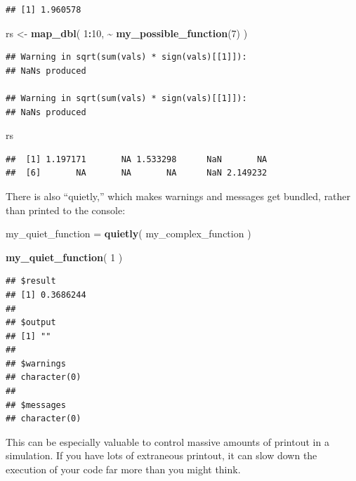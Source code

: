 \documentclass[
]{book}
\newenvironment{Shaded}{\begin{snugshade}}{\end{snugshade}}
\newcommand{\DecValTok}[1]{\textcolor[rgb]{0.00,0.00,0.81}{#1}}
\newcommand{\FunctionTok}[1]{\textcolor[rgb]{0.13,0.29,0.53}{\textbf{#1}}}
\newcommand{\NormalTok}[1]{#1}
\newcommand{\OtherTok}[1]{\textcolor[rgb]{0.56,0.35,0.01}{#1}}
\newcommand{\SpecialCharTok}[1]{\textcolor[rgb]{0.81,0.36,0.00}{\textbf{#1}}}
\begin{document}
\begin{verbatim}
## [1] 1.960578
\end{verbatim}

\begin{Shaded}
\begin{Highlighting}[]
\NormalTok{rs }\OtherTok{\textless{}{-}} \FunctionTok{map\_dbl}\NormalTok{( }\DecValTok{1}\SpecialCharTok{:}\DecValTok{10}\NormalTok{, }\SpecialCharTok{\textasciitilde{}} \FunctionTok{my\_possible\_function}\NormalTok{(}\DecValTok{7}\NormalTok{) )}
\end{Highlighting}
\end{Shaded}

\begin{verbatim}
## Warning in sqrt(sum(vals) * sign(vals)[[1]]):
## NaNs produced

## Warning in sqrt(sum(vals) * sign(vals)[[1]]):
## NaNs produced
\end{verbatim}

\begin{Shaded}
\begin{Highlighting}[]
\NormalTok{rs}
\end{Highlighting}
\end{Shaded}

\begin{verbatim}
##  [1] 1.197171       NA 1.533298      NaN       NA
##  [6]       NA       NA       NA      NaN 2.149232
\end{verbatim}

There is also ``quietly,'' which makes warnings and messages get bundled, rather than printed to the console:

\begin{Shaded}
\begin{Highlighting}[]
\NormalTok{my\_quiet\_function }\OtherTok{=} \FunctionTok{quietly}\NormalTok{( my\_complex\_function )}

\FunctionTok{my\_quiet\_function}\NormalTok{( }\DecValTok{1}\NormalTok{ )}
\end{Highlighting}
\end{Shaded}

\begin{verbatim}
## $result
## [1] 0.3686244
## 
## $output
## [1] ""
## 
## $warnings
## character(0)
## 
## $messages
## character(0)
\end{verbatim}

This can be especially valuable to control massive amounts of printout in a simulation. If you have lots of extraneous printout, it can slow down the execution of your code far more than you might think.
\end{document}
